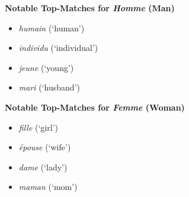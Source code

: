 \begin{problem}[1]
\begin{answer}
    \textbf{Notable Top-Matches for \emph{Homme} (Man)}
    \begin{itemize}
      \item \emph{humain} (`human')
      \item \emph{individu} (`individual')
      \item \emph{jeune} (`young')
      \item \emph{mari} (`husband')
    \end{itemize}
  
    \textbf{Notable Top-Matches for \emph{Femme} (Woman)}
    \begin{itemize}
      \item \emph{fille} (`girl')
      \item \emph{\'epouse} (`wife')
      \item \emph{dame} (`lady')
      \item \emph{maman} (`mom')
    \end{itemize}
  \end{answer}
\end{problem}

